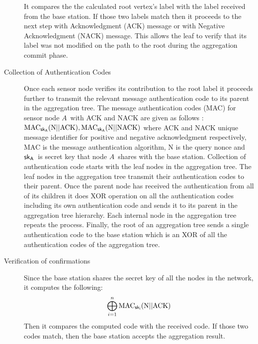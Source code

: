 \begin{description}
			It compares the the calculated root vertex's label with the label received from the base station.
			If those two labels match then it proceeds to the next step with Acknowledgment (ACK) message or with Negative Acknowledgment (NACK) message.
			This allows the leaf to verify that its label was not modified on the path to the root during the aggregation commit phase.
		\item[Collection of Authentication Codes] 
			Once each sensor node verifies its contribution to the root label it proceeds further to transmit the relevant message authentication code to its parent in the aggregation tree.
			The message authentication codes (MAC) for sensor node $A$\ with ACK and NACK are given as follows :
$					\mbox{MAC}_{\sf{sk}_{A}}( \mbox{N} || \mbox{ACK}),
						\mbox{MAC}_{\sf{sk}_{A}}( \mbox{N} || \mbox{NACK})$	
			where ACK and NACK unique message identifier for positive and negative acknowledgment respectively,
			MAC is  the message authentication algorithm, 
			N is the query nonce and $\sf{sk}_{A}$\ is secret key that node $A$\ shares with the base station.
			Collection of authentication code starts with the leaf nodes in the aggregation tree.
			The leaf nodes in the aggregation tree transmit their authentication codes to their parent.
			Once the parent node has received the authentication from all of its children it does XOR operation on all the authentication codes including its own authentication code and sends it to its parent in the aggregation tree hierarchy.
			Each internal node in the aggregation tree repeats the process.
			Finally, the root of an aggregation tree sends a single authentication code to the base station which is an XOR of all the authentication codes of the aggregation tree.  
		\item[Verification of confirmations]
			Since the base station shares the secret key of all the nodes in the network, it computes the following:
			\begin{equation*}
				\bigoplus_{i = 1}^n \mbox{MAC}_{\sf{sk}_{i}}(\mbox{N} || \mbox{ACK})
			\end{equation*}
			Then it compares the computed code with the received code. 
			If those two codes match, then the base station accepts the aggregation result.
	\end{description}

